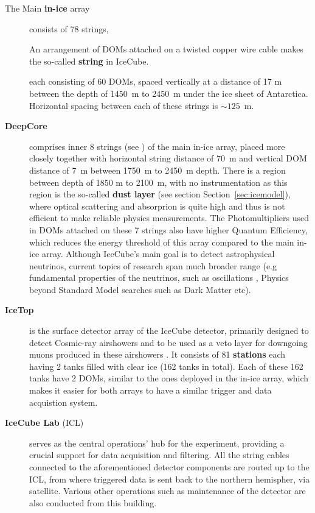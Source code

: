 \begin{description}
	\item[The Main \textbf{in-ice} array] consists of 78 strings,\marginnote
    {\begin{kaobox}[title=\textbf{\textbf{string} in IceCube}]
        An arrangement of DOMs attached on a twisted copper wire cable makes the so-called \textbf{string} in IceCube.
    \end{kaobox}}
    each consisting of 60 DOMs, spaced vertically at a distance of 17 m between the depth of 1450~m to 2450~m under the ice sheet of Antarctica. Horizontal spacing between each of these strings is $\sim 125$~m.
      
	\item[\textbf{DeepCore}] comprises inner 8 strings (see ) of the main in-ice array, placed more closely together with horizontal string distance of 70~m and vertical DOM distance of 7~m  between 1750~m to 2450~m depth. There is a region between depth of 1850 m to 2100~m, with no instrumentation as this region is the so-called \textbf{dust layer} (see section Section~\ref{sec:icemodel}), where optical scattering and absorprion is quite high and thus is not efficient to make reliable physics measurements. The Photomultipliers used in DOMs attached on these 7 strings also have higher Quantum Efficiency, which reduces the energy threshold of this array compared to the main in-ice array. Although IceCube's main goal is to detect astrophysical neutrinos, current topics of research span much broader range (e.g fundamental properties of the neutrinos, such as oscillations , Physics beyond Standard Model searches such as Dark Matter  etc). 
	
    \item[\textbf{IceTop}] is the surface detector array of the IceCube detector, primarily designed to detect Cosmic-ray airshowers and to be used as a veto layer for downgoing muons produced in these airshowers . It consists of 81 \textbf{stations} each having 2 tanks filled with clear ice (162 tanks in total). Each of these 162 tanks have 2 DOMs, similar to the ones deployed in the in-ice array, which makes it easier for both arrays to have a similar trigger and data acquistion system.
	
    \item[\textbf{IceCube Lab} (ICL)] serves as the central operations' hub for the experiment, providing a crucial support for data acquisition and filtering. All the string cables connected to the aforementioned detector components are routed up to the ICL, from where triggered data is sent back to the northern hemispher, via satellite. Various other operations such as maintenance of the detector are also conducted from this building.
	\end{description}

